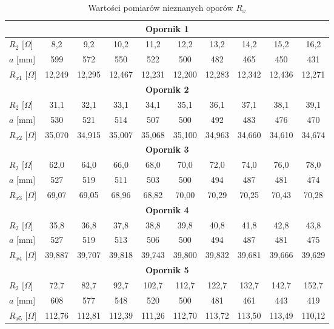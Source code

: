 \documentclass[12pt,a4paper]{article}
\numberwithin{equation}{section}
\begin{document}
\begin{table}[!ht]
	\caption{Wartości pomiarów nieznanych oporów $R_x$}
	\begin{adjustbox}{width=1\textwidth}
		\begin{center}
			\begin{tabular}{l||c|c|c|c|c|c|c|c|c}
				\multicolumn{10}{c}{\bfseries Opornik 1} \\ \hline
				$R_2$ [$\Omega$] & 8,2 & 9,2 & 10,2 & 11,2 & 12,2 & 13,2 & 14,2 & 15,2 & 16,2 \\
				$a$ [mm] & 599 & 572 & 550 & 522 & 500 & 482 & 465 & 450 & 431 \\
				$R_{x1}$ [$\Omega$] & 12,249 & 12,295 & 12,467 & 12,231 & 12,200 & 12,283 & 12,342 & 12,436 & 12,271 \\ \hline
				\multicolumn{10}{c}{\bfseries Opornik 2} \\ \hline
				$R_2$ [$\Omega$] & 31,1 & 32,1 & 33,1 & 34,1 & 35,1 & 36,1 & 37,1 & 38,1 & 39,1 \\
				$a$ [mm] & 530 & 521 & 514 & 507 & 500 & 492 & 483 & 476 & 470 \\
				$R_{x2}$ [$\Omega$] & 35,070 & 34,915 & 35,007 & 35,068 & 35,100 & 34,963 & 34,660 & 34,610 & 34,674 \\ \hline
				\multicolumn{10}{c}{\bfseries Opornik 3} \\ \hline
				$R_2$ [$\Omega$] & 62,0 & 64,0 & 66,0 & 68,0 & 70,0 & 72,0 & 74,0 & 76,0 & 78,0 \\
				$a$ [mm] & 527 & 519 & 511 & 503 & 500 & 494 & 487 & 481 & 474 \\
				$R_{x3}$ [$\Omega$] & 69,07 & 69,05 & 68,96 & 68,82 & 70,00 & 70,29 & 70,25 & 70,43 & 70,28 \\ \hline
				\multicolumn{10}{c}{\bfseries Opornik 4} \\ \hline
				$R_2$ [$\Omega$] & 35,8 & 36,8 & 37,8 & 38,8 & 39,8 & 40,8 & 41,8 & 42,8 & 43,8 \\
				$a$ [mm] & 527 & 519 & 513 & 506 & 500 & 494 & 487 & 481 & 475 \\
				$R_{x4}$ [$\Omega$] & 39,887 & 39,707 & 39,818 & 39,743 & 39,800 & 39,832 & 39,681 & 39,666 & 39,629 \\ \hline
				\multicolumn{10}{c}{\bfseries Opornik 5} \\ \hline
				$R_2$ [$\Omega$] & 72,7 & 82,7 & 92,7 & 102,7 & 112,7 & 122,7 & 132,7 & 142,7 & 152,7 \\
				$a$ [mm] & 608 & 577 & 548 & 520 & 500 & 481 & 461 & 443 & 419 \\
				$R_{x5}$ [$\Omega$] & 112,76 & 112,81 & 112,39 & 111,26 & 112,70 & 113,72 & 113,50 & 113,49 & 110,12 \\ \hline
			\end{tabular}
		\end{center}
	\end{adjustbox}
	\label{tab:tab1}
\end{table}
\end{document}
